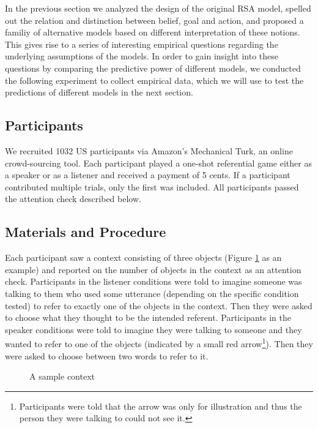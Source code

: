 In the previous section we analyzed the design of the original RSA model, spelled out the relation and distinction between belief, goal and action, and proposed a familiy of alternative models based on different interpretation of these notions. This gives rise to a series of interesting empirical questions regarding the underlying assumptions of the models. In order to gain insight into these questions by comparing the predictive power of different models, we conducted the following experiment to collect empirical data, which we will use to test the predictions of different models in the next section.

\subsection*{Participants}

We recruited 1032 US participants via Amazon's Mechanical Turk, an
online crowd-sourcing tool. Each participant played a one-shot
referential game either as a speaker or as a listener and received a
payment of 5 cents. If a participant contributed multiple trials, only
the first was included. All participants passed the attention check
described below.

\subsection*{Materials and Procedure}

Each participant saw a context consisting of three objects (Figure
\ref{exp_context} as an example) and reported on the number of objects
in the context as an attention check. Participants in the listener
conditions were told to imagine someone was talking to them who used
some utterance (depending on the specific condition tested) to refer
to exactly one of the objects in the context. Then they were asked to
choose what they thought to be the intended referent. Participants in
the speaker conditions were told to imagine they were talking to
someone and they wanted to refer to one of the objects (indicated by a
small red arrow\footnote{Participants were told that the arrow was
  only for illustration and thus the person they were talking to could
  not see it.}). Then they were asked to choose between two words to
refer to it.

\begin{figure}[htb] 
  \centering
  
  \caption{A sample context}\label{exp_context}
\end{figure}

